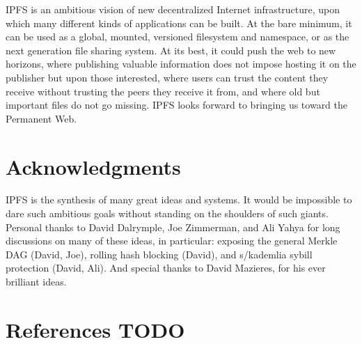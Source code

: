 \documentclass{sig-alternate}
\begin{document}
IPFS is an ambitious vision of new decentralized Internet infrastructure, upon which many different kinds of applications can be built. At the bare minimum, it can be used as a global, mounted, versioned filesystem and namespace, or as the next generation file sharing system. At its best, it could push the web to new horizons, where publishing valuable information does not impose hosting it on the publisher but upon those interested, where users can trust the content they receive without trusting the peers they receive it from, and where old but important files do not go missing. IPFS looks forward to bringing us toward the Permanent Web.


\section{Acknowledgments}

IPFS is the synthesis of many great ideas and systems. It would be impossible to dare such ambitious goals without standing on the shoulders of such giants. Personal thanks to David Dalrymple, Joe Zimmerman, and Ali Yahya for long discussions on many of these ideas, in particular: exposing the general Merkle DAG (David, Joe), rolling hash blocking (David), and s/kademlia sybill protection (David, Ali). And special thanks to David Mazieres, for his ever brilliant ideas.

\section{References TODO}

%
%
\end{document}

